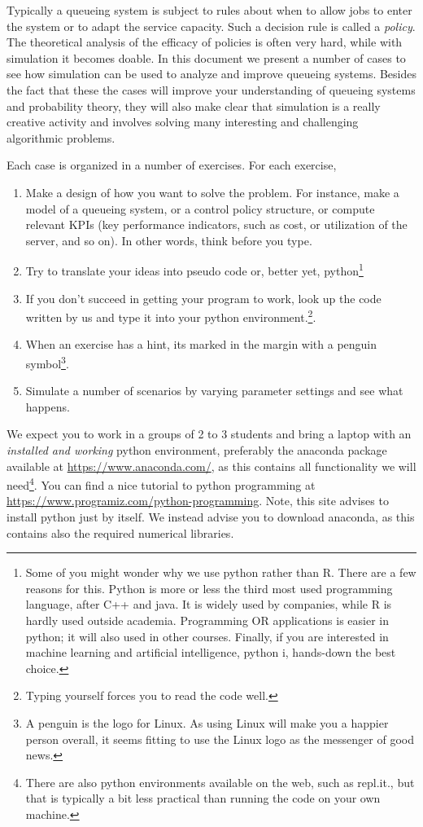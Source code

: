Typically a queueing system is subject to rules about when to allow jobs to enter the system or to adapt the service capacity.
Such a decision rule is called a \emph{policy}.
The theoretical analysis of the efficacy of policies is often very hard, while with simulation it becomes doable.
In this document we present a number of cases to see how simulation can be used to analyze and improve queueing systems.
Besides the fact that these the cases will improve your understanding of queueing systems and probability theory, they will also make clear that simulation is a really creative activity and involves solving many interesting and challenging algorithmic problems.


Each case is organized in a number of exercises.
For each exercise,
\begin{enumerate}
\item Make a design of how you want to solve the problem.
  For instance, make a model of a queueing system, or a control policy structure, or compute relevant KPIs (key performance indicators, such as cost, or utilization of the server, and so on).
  In other words, think before you type.
\item Try to translate your ideas into pseudo code or, better yet, python\footnote{Some of you might wonder why we use python rather than R.
    There are a few reasons for this.
    Python is more or less the third most used programming language, after C++ and java.
    It is widely used by companies, while R is hardly used outside academia.
    Programming OR applications is easier in python; it will also used in other courses.
    Finally, if you are interested in machine learning and artificial intelligence, python i, hands-down the best choice.}
  \item If you don't succeed in getting your program to work,  look up the code written by us and type it into your python environment.\footnote{Typing yourself forces you to read the code well.}.
  \item When an exercise has a hint, its marked in the margin with a penguin symbol\footnote{A penguin is the logo for Linux.
      As using Linux will make you a happier person overall, it seems fitting to use the Linux logo as the messenger of good news.}.
    
  \item Simulate a number of scenarios by varying parameter settings and see what happens.
\end{enumerate}

We expect you to work in a groups of 2 to 3 students and bring a laptop with an \emph{installed and working} python environment, preferably  the anaconda package available at \url{https://www.anaconda.com/},  as this contains all functionality we will need\footnote{There are also python environments available on the web, such as repl.it., but that is typically a bit less practical than running the code on your own machine.}. You can find a nice tutorial to python programming at  \url{https://www.programiz.com/python-programming}. Note, this site advises to install python just by itself. We instead advise you to download anaconda, as this contains also the required numerical libraries. 

